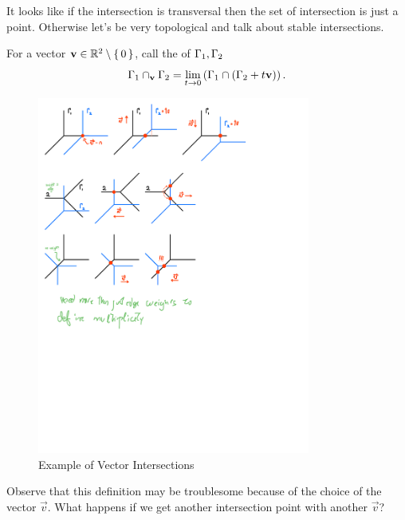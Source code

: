 \documentclass[12pt]{memoir}
\theoremstyle{definition}
\begin{document}
It looks like if the intersection is transversal then the set of intersection is just a point. Otherwise let's be very topological and talk about stable intersections.

\begin{Def}
    For a vector $\mathbf{v}\in\mathbb{R}^2\setminus\{\,0\,\}$, call the  of $\Gamma_1,\Gamma_2$
    $$\Gamma_1\cap_{\mathbf{v}}\Gamma_2=\lim_{t\to 0}\left(\Gamma_1\cap(\Gamma_2+t\mathbf{v})\right).$$
\end{Def}

\begin{figure}[h!]
    \centering
    \includegraphics[width=0.8\textwidth, trim= 0.1cm 23.25cm 5cm 0.25cm,clip]{figs/fig11-3-4-and-5-VectorIntersections.pdf}
    \caption{Example of Vector Intersections}
    \label{fig:11.3-VectorIntersection1}
\end{figure} 

Observe that this definition may be troublesome because of the choice of the vector $\vec v$. What happens if we get another intersection point with another $\vec v$?
\end{document}
